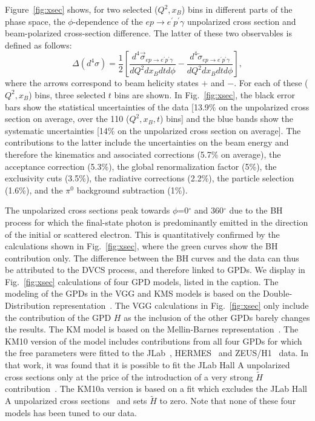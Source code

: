 \documentclass[nofootinbib,twocolumn,showpacs,prl,superscriptaddress,secnumarabic,amssymb,nobibnotes,aps,floatfix]{revtex4-1}
\begin{document}
Figure~\ref{fig:xsec} shows, for two selected ($Q^2,x_B$) bins in different parts
of the phase space, the $\phi$-dependence of the $ep\to e^\prime p^\prime \gamma$
unpolarized cross section and beam-polarized cross-section difference.
The latter of these two observables is defined as follows:
\begin{equation}
\Delta(d^4\sigma)=\frac{1}{2}\left[\frac{d^4 \overrightarrow{\sigma}_{ep\to e^\prime p^\prime \gamma}}
{dQ^2 dx_B dt d\phi}
-\frac{d^4 \overleftarrow{\sigma}_{ep\to e^\prime p^\prime \gamma}}{dQ^2 dx_B dt d\phi}\right],
\end{equation}
where the arrows correspond to beam helicity states $+$ and $-$.
For each of these ($Q^2,x_B$) bins, three selected $t$ bins are shown.
In Fig.~\ref{fig:xsec},
the black error bars show the statistical uncertainties of the data [13.9\% on the unpolarized
cross section on average, over the 110 ($Q^2,x_B,t$) bins] and the blue bands show the
systematic uncertainties [14\% on the unpolarized cross section on average].
The contributions to the latter include the uncertainties on the beam energy and
therefore the kinematics and associated corrections (5.7\% on average), 
the acceptance correction (5.3\%), the global renormalization factor (5\%),
the exclusivity cuts (3.5\%), the radiative corrections (2.2\%), the particle selection
(1.6\%), and the $\pi^0$ background subtraction (1\%).

The unpolarized cross sections peak towards
$\phi$=0$^\circ$ and 360$^\circ$ due to the BH process for which the final-state  
photon is predominantly emitted in the direction of the initial or scattered electron.
This is quantitatively confirmed by the calculations shown in Fig.~\ref{fig:xsec},
where the green curves show the BH contribution only. The difference between the BH
curves and the data can thus be attributed to the DVCS process, and therefore linked to GPDs. 
We display in Fig.~\ref{fig:xsec} calculations of four GPD models, listed in the caption.
The modeling of the GPDs in the VGG and KMS models is based on the Double-Distribution 
representation~\cite{Radyushkin:1998es,Radyushkin:1998bz,Mueller:1998fv}. The VGG
calculations in Fig.~\ref{fig:xsec} only include the contribution of the GPD $H$
as the inclusion of the other GPDs barely changes the results. The KM model is based 
on the Mellin-Barnes 
representation~\cite{Kumericki:2009uq, Mueller:2005ed}. The KM10 version of the 
model includes contributions from all four GPDs for which the free parameters
were fitted to the JLab~\cite{Munoz Camacho:2006hx,Girod:2007aa}, 
HERMES~\cite{Airapetian}
and ZEUS/H1~\cite{Chekanov:2003ya,Aktas:2005ty} data.
In that work, it was found that it is possible to fit the JLab Hall A unpolarized cross sections
only at the price of the introduction of a very strong $\tilde H$ contribution~\cite{Htilde}.
The KM10a version is based on a fit which excludes the JLab Hall A unpolarized cross sections~\cite{Munoz Camacho:2006hx} 
and sets $\tilde H$ to zero. Note that none of these four models has been tuned to our data.
\end{document}

